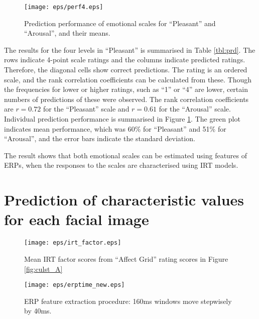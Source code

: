 \documentclass[fonts]{icst}
\begin{document}
\begin{figure}[tb]
   \begin{center}
    \texttt{[image: eps/perf4.eps]}
   \end{center}
  \caption{Prediction performance of emotional scales for ``Pleasant''
 and ``Arousal'', and their means.}
  \label{fig:perf_4}
\end{figure}

The results for the four levels in ``Pleasant'' is summarised in Table
\ref{tbl:prd}. The rows indicate 4-point scale ratings and the columns
indicate predicted ratings. Therefore, the diagonal cells show correct
predictions.  
The rating is an ordered scale, and the rank correlation coefficients can be
calculated from these. 
Though the frequencies for lower or higher ratings, such as ``1'' or ``4''
are lower, certain numbers of predictions of these were observed. 
The rank correlation coefficients are $r=0.72$ for the ``Pleasant'' scale
and $r=0.61$ for the ``Arousal'' scale. 
Individual prediction performance is summarised in Figure
\ref{fig:perf_4}. The green plot indicates mean performance, which was
60\% for ``Pleasant'' and 51\% for ``Arousal'', and the error bars
indicate the standard deviation.  

The result shows that both emotional scales can be estimated using
features of ERPs, when the responses to the scales are characterised
using IRT models. 


\section{Prediction of characteristic values for each facial image}

\begin{figure}[tb]
   \begin{center}
    \texttt{[image: eps/irt\_factor.eps]}
   \end{center}
  \caption{Mean IRT factor scores from ``Affect Grid'' rating scores in
 Figure \ref{fig:culst_A}}
  \label{fig:irtfactor}
\end{figure}

\begin{figure*}[tb]
   \begin{center}
    \texttt{[image: eps/erptime\_new.eps]}
   \end{center}
  \caption{ERP feature extraction procedure: 160ms windows move
 stepwisely by 40ms.}
  \label{fig:erp_time}
\end{figure*}
\end{document}
